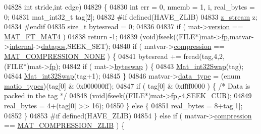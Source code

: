 \begin{DoxyCode}
{{{{{{{{{{{{{{{{{{{{{{{{{{{{04828                       \textcolor{keywordtype}{int} stride,\textcolor{keywordtype}{int} edge)
04829 \{
04830     \textcolor{keywordtype}{int} err = 0, nmemb = 1, i, real\_bytes = 0;
04831     mat\_int32\_t tag[2];
04832 \textcolor{preprocessor}{#if defined(HAVE\_ZLIB)}
04833     \hyperlink{structz__stream__s}{z\_stream} z;
04834 \textcolor{preprocessor}{#endif}
04835     \textcolor{keywordtype}{size\_t} bytesread = 0;
04836 
04837     \textcolor{keywordflow}{if} ( mat->\hyperlink{struct__mat__t_a729c2bc0afc97485057a5af425635b1a}{version} == \hyperlink{group___m_a_t_ggad03442b8378999189d510e3745c702b7a858b4f5da65548219b1c3ad47aa478d3}{MAT\_FT\_MAT4} )
04838         \textcolor{keywordflow}{return} -1;
04839     (void)fseek((FILE*)mat->\hyperlink{struct__mat__t_a85f562e407ca9ad4d2a6e14f839432b7}{fp},matvar->\hyperlink{group___m_a_t_a6e97e3ed9f40c49322c18561c2a94e92}{internal}->\hyperlink{structmatvar__internal_afd3bfaab126a160bd6855563e1ea0a7e}{datapos},SEEK\_SET);
04840     \textcolor{keywordflow}{if} ( matvar->\hyperlink{group___m_a_t_aeef0466048621cb2c959ba7f6c774d06}{compression} == \hyperlink{group___m_a_t_gga768c318af97bd2567758ecb001ceb7f4a2280b97631ff5dd24dec55261dc587b6}{MAT\_COMPRESSION\_NONE} ) \{
04841         bytesread += fread(tag,4,2,(FILE*)mat->\hyperlink{struct__mat__t_a85f562e407ca9ad4d2a6e14f839432b7}{fp});
04842         \textcolor{keywordflow}{if} ( mat->\hyperlink{struct__mat__t_a99d207977af5e04941ace56d71817a40}{byteswap} ) \{
04843             \hyperlink{endian_8c_a2e0153996243f0a34df9a5286087cfa3}{Mat\_int32Swap}(tag);
04844             \hyperlink{endian_8c_a2e0153996243f0a34df9a5286087cfa3}{Mat\_int32Swap}(tag+1);
04845         \}
04846         matvar->\hyperlink{group___m_a_t_ab6aafe9bd77f0f077852593dec438144}{data\_type} = (\textcolor{keyword}{enum} \hyperlink{group___m_a_t_gacf7b3b879282b7ab3a51190e49bf3453}{matio\_types})(tag[0] & 0x000000ff);
04847         \textcolor{keywordflow}{if} ( tag[0] & 0xffff0000 ) \{ \textcolor{comment}{/* Data is packed in the tag */}
04848             (void)fseek((FILE*)mat->\hyperlink{struct__mat__t_a85f562e407ca9ad4d2a6e14f839432b7}{fp},-4,SEEK\_CUR);
04849             real\_bytes = 4+(tag[0] >> 16);
04850         \} \textcolor{keywordflow}{else} \{
04851             real\_bytes = 8+tag[1];
04852         \}
04853 \textcolor{preprocessor}{#if defined(HAVE\_ZLIB)}
04854     \} \textcolor{keywordflow}{else} \textcolor{keywordflow}{if} ( matvar->\hyperlink{group___m_a_t_aeef0466048621cb2c959ba7f6c774d06}{compression} == \hyperlink{group___m_a_t_gga768c318af97bd2567758ecb001ceb7f4a5181d2f71eab0f12f05ba65d4f13fb53}{MAT\_COMPRESSION\_ZLIB} ) \{
}}}}}}}}}}}}}}}}}}}}}}}}}}}}
\end{DoxyCode}
